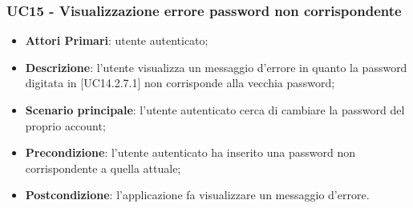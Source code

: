 \subsubsection{UC15 - Visualizzazione errore password non corrispondente}
\begin{itemize}
	\item \textbf{Attori Primari}: utente autenticato;
	\item \textbf{Descrizione}: l'utente visualizza un messaggio d'errore in quanto la password digitata in [UC14.2.7.1] non corrisponde alla vecchia password;
	\item \textbf{Scenario principale}: l'utente autenticato cerca di cambiare la password del proprio account;
	\item \textbf{Precondizione}: l'utente autenticato ha inserito una password non corrispondente a quella attuale;
	\item \textbf{Postcondizione}: l'applicazione fa visualizzare un messaggio d'errore.
\end{itemize}



